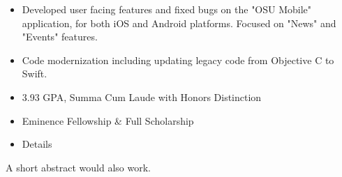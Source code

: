 \documentclass[10pt,letterpaper,ragged2e,withhyper]{altacv}
\begin{document}
\begin{paracol}{2}
\begin{itemize}
\item Developed user facing features and fixed bugs on the "OSU Mobile" application, for both iOS and Android platforms. Focused on "News" and "Events" features. 
\item Code modernization including updating legacy code from Objective C to Swift.
\end{itemize}


\switchcolumn


\begin{itemize}
\item 3.93 GPA, Summa Cum Laude with Honors Distinction
\item Eminence Fellowship \& Full Scholarship
\end{itemize}



\begin{itemize}
\item Details
\end{itemize}

\divider

A short abstract would also work.

\medskip


\\

\medskip


\\

\end{paracol}
\end{document}
